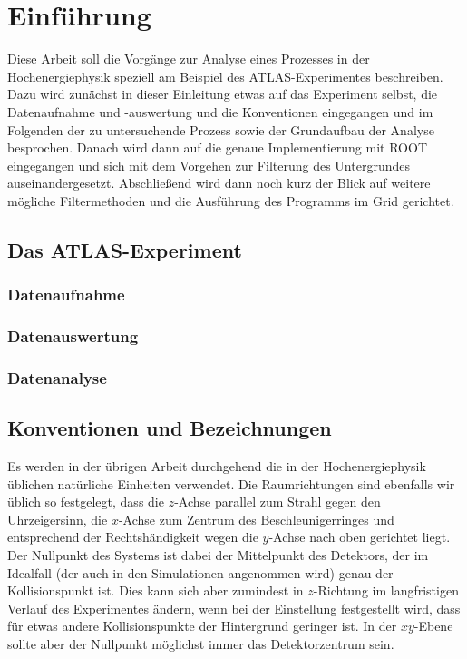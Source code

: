\section{Einführung}
Diese Arbeit soll die Vorgänge zur Analyse eines Prozesses in der
Hochenergiephysik speziell am Beispiel des ATLAS-Experimentes beschreiben.  Dazu
wird zunächst in dieser Einleitung etwas auf das Experiment selbst, die
Datenaufnahme und -auswertung und die Konventionen eingegangen und im Folgenden
der zu untersuchende Prozess sowie der Grundaufbau der Analyse besprochen.
Danach wird dann auf die genaue Implementierung mit ROOT eingegangen und sich
mit dem Vorgehen zur Filterung des Untergrundes auseinandergesetzt. Abschließend
wird dann noch kurz der Blick auf weitere mögliche Filtermethoden und die
Ausführung des Programms im Grid gerichtet.

\subsection{Das ATLAS-Experiment}


\subsubsection{Datenaufnahme}
\subsubsection{Datenauswertung}
\subsubsection{Datenanalyse}

\subsection{Konventionen und Bezeichnungen}
Es werden in der übrigen Arbeit durchgehend die in der Hochenergiephysik
üblichen natürliche Einheiten verwendet. Die Raumrichtungen sind ebenfalls wir
üblich so festgelegt, dass die $z$-Achse parallel zum Strahl gegen den
Uhrzeigersinn, die $x$-Achse zum Zentrum des Beschleunigerringes und entsprechend
der Rechtshändigkeit wegen die $y$-Achse nach oben gerichtet liegt. Der Nullpunkt
des Systems ist dabei der Mittelpunkt des Detektors, der im Idealfall (der auch
in den Simulationen angenommen wird) genau der Kollisionspunkt ist.  Dies kann
sich aber zumindest in $z$-Richtung im langfristigen Verlauf des Experimentes
ändern, wenn bei der Einstellung festgestellt wird, dass für etwas andere
Kollisionspunkte der Hintergrund geringer ist. In der $xy$-Ebene sollte aber der
Nullpunkt möglichst immer das Detektorzentrum sein.

